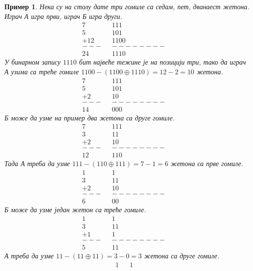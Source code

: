 \documentclass[a4paper]{article}
\newtheorem{example}{Пример}
\begin{document}
\begin{example} 
	Нека су на столу дате три гомиле са седам, пет, дванаест жетона. Играч \textit{А} игра први, играч \textit{Б} игра други.	
		\begin{align*}
			7&		&   1 1 1&\\
			5&		&   1 0 1&\\
			+12&	& 1 1 0 0&\\
			---&	&--------&\\
			24&		& 1 1 1 0
		\end{align*}		
	У бинарном запису $ 1 1 1 0 $ бит највеће тежине је на позицији три, тако да играч \textit{А} узима са треће гомиле $ 1 1 0 0 - (1 1 0 0 \oplus  1 1 1 0) = 12 - 2 = 10 $  жетона.	
		\begin{align*}
			7&		&  	1 1 1&\\
			5&		&   1 0 1&\\
			+2&		&  	  1 0&\\
			---&	&--------&\\
			14&		&   0 0 0
		\end{align*}
	\textit{Б} може да узме на пример два жетона са друге гомиле.
		\begin{align*}
			7&		&   1 1 1&\\
			3&		&     1 1&\\
			+2&		&  	  1 0&\\
			---&	&--------&\\
			12&		&   1 1 0
		\end{align*}
	Тада \textit{А} треба да узме $ 1 1 1 - (1 1 0 \oplus 1 1 1) = 7 - 1 = 6 $  жетона са прве гомиле.
		\begin{align*}
			1&		&       1&\\
			3&		&     1 1&\\
			+2&		&  	  1 0&\\
			---&	&--------&\\
			6&		&     0 0
		\end{align*}
	\textit{Б} може да узме један жетон са треће гомиле.
		\begin{align*}
			1&		&       1&\\
			3&		&     1 1&\\
			+1&		&  	  	1&\\
			---&	&--------&\\
			5&		&     1 1
		\end{align*}
	\textit{А} треба да узме $ 1 1 - (1 1 \oplus 1 1) = 3 - 0 = 3 $ жетона са друге гомиле.
		\begin{align*}
			1&		&       1&\\

\end{align*}
\end{example}
\end{document}
